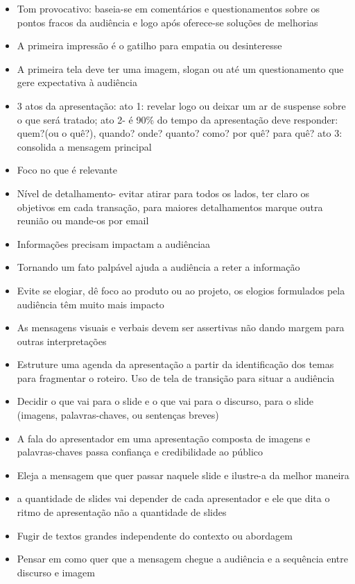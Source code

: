 \begin{itemize}
    \item Tom provocativo: baseia-se em comentários e questionamentos sobre os pontos fracos da audiência e logo após oferece-se soluções de melhorias
    \item A primeira impressão é o gatilho para empatia ou desinteresse
    \item A primeira tela deve ter uma imagem, slogan ou até um questionamento que gere expectativa à audiência
    \item 3 atos da apresentação: ato 1: revelar logo ou deixar um ar de suspense sobre o que será tratado; ato 2- é 90\% do tempo da apresentação deve responder: quem?(ou o quê?), quando? onde? quanto? como? por quê? para quê? ato 3: consolida a mensagem principal
    \item Foco no que é relevante 
    \item Nível de detalhamento- evitar atirar para todos os lados, ter claro os objetivos em cada transação, para maiores detalhamentos marque outra reunião ou mande-os por email
    \item Informações precisam impactam a audiênciaa
    \item Tornando um fato palpável ajuda a audiência a reter a informação
    \item Evite se elogiar, dê foco ao produto ou ao projeto, os elogios formulados pela audiência têm muito mais impacto
    \item As mensagens visuais e verbais devem ser assertivas não dando margem para outras interpretações
    \item Estruture uma agenda da apresentação a partir da identificação dos temas para fragmentar o roteiro. Uso de tela de transição para situar a audiência
    \item Decidir o que vai para o slide e o que vai para o discurso, para o slide (imagens, palavras-chaves, ou sentenças breves)
    \item A fala do apresentador em uma apresentação composta de imagens e palavras-chaves passa confiança e credibilidade ao público
    \item Eleja a mensagem que quer passar naquele slide e ilustre-a da melhor maneira
    \item a quantidade de slides vai depender de cada apresentador e ele que dita o ritmo de apresentação não a quantidade de slides
    \item Fugir de textos grandes independente do contexto ou abordagem
    \item Pensar em como quer que a mensagem chegue a audiência e a sequência entre discurso e imagem

\end{itemize}
